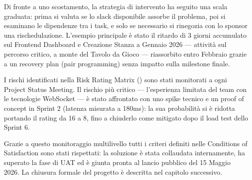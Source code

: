 Di fronte a uno scostamento, la strategia di intervento ha seguito una scala graduata: prima si valuta se lo slack disponibile assorbe il problema, poi si esaminano le dipendenze tra i task, e solo se necessario si rinegozia con lo sponsor una rischedulazione. L'esempio principale è stato il ritardo di 3 giorni accumulato sul Frontend Dashboard e Creazione Stanza a Gennaio 2026 --- attività sul percorso critico, a monte del Tavolo da Gioco --- riassorbito entro Febbraio grazie a un recovery plan (pair programming) senza impatto sulla milestone finale.

I rischi identificati nella Risk Rating Matrix () sono stati monitorati a ogni Project Status Meeting. Il rischio più critico --- l'esperienza limitata del team con le tecnologie WebSocket --- è stato affrontato con uno spike tecnico e un proof of concept in Sprint 2 (latenza misurata a 180ms): la sua probabilità si è ridotta portando il rating da 16 a 8, fino a chiuderlo come mitigato dopo il load test dello Sprint 6.

Grazie a questo monitoraggio multilivello tutti i criteri definiti nelle Conditions of Satisfaction sono stati rispettati: la soluzione è stata collaudata internamente, ha superato la fase di UAT ed è giunta pronta al lancio pubblico del 15 Maggio 2026. La chiusura formale del progetto è descritta nel capitolo successivo.
